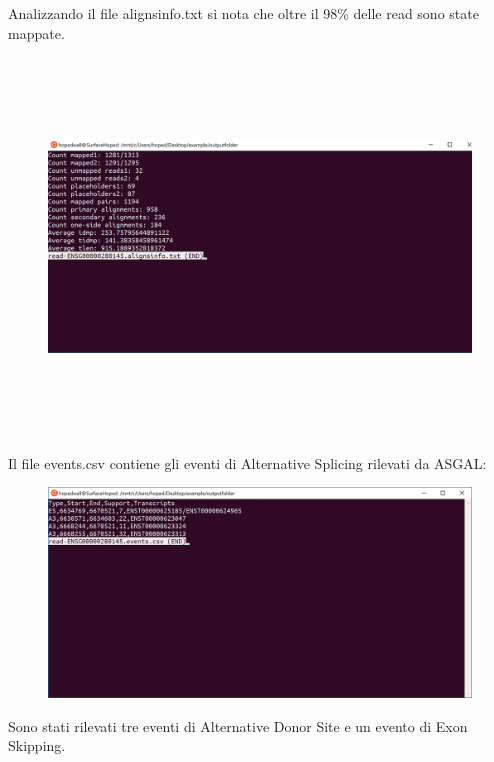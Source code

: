 Analizzando il file alignsinfo.txt si nota che oltre il 98\% delle read sono state mappate.

\begin{figure}[h!]
	\centering
	\includegraphics[width=\linewidth,height=10cm]{images/alignsinfotxt.png}
  \label{fig:AlignsInfoExperiment}
\end{figure}

\newpage

Il file events.csv contiene gli eventi di Alternative Splicing rilevati da ASGAL:


\begin{figure}[h!]
	\centering
	\includegraphics[width=\linewidth]{images/results.png}
  \label{fig:Parameters}
\end{figure}

Sono stati rilevati tre eventi di Alternative Donor Site e un evento di Exon Skipping.

\newpage